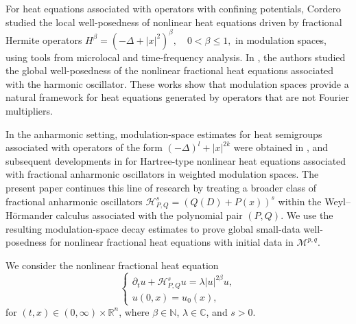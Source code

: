 \documentclass[12pt, reqno]{amsart}
\newcommand{\M}{\mathcal{M}}
\theoremstyle{definition}
\theoremstyle{remark}
\numberwithin{equation}{section}
\newcommand{\APQ}{\mathcal{H}_{P, Q}}
\begin{document}
For heat equations associated with operators with confining potentials, Cordero \cite{CorderoHermite} studied the local well-posedness of nonlinear heat equations driven by fractional Hermite operators $H^\beta=(-\Delta+|x|^2)^\beta,
\quad 0<\beta\leq 1,$ in modulation spaces, using tools from microlocal and time-frequency analysis. In \cite{than:hs}, the authors studied the global well-posedness of the nonlinear fractional heat equations associated with the harmonic oscillator.  These works show that modulation spaces provide a natural framework for heat equations generated by operators that are not Fourier multipliers.

In the anharmonic setting, modulation-space estimates for heat semigroups associated with operators of the form $(-\Delta)^l+|x|^{2k}$
were obtained in \cite{Cardona}, and subsequent developments in \cite{Dolai, Dolai2} for  Hartree-type nonlinear heat equations associated with fractional anharmonic oscillators in weighted modulation spaces. The present paper continues this line of research by treating a broader class of fractional anharmonic oscillators $\mathcal H_{P,Q}^s=(Q(D)+P(x))^s$
within the Weyl--H\"ormander calculus associated with the polynomial pair $(P,Q)$. We use the resulting modulation-space decay estimates to prove global small-data well-posedness for nonlinear fractional heat equations with initial data in $\M^{p,q}$.



We consider the nonlinear fractional heat equation
\begin{equation}
\label{nonpro}
    \begin{cases}
        \partial_t u+\APQ^s u=\lambda |u|^{2\beta}u,\\
        u(0,x)=u_0(x),
    \end{cases}
\end{equation}
for $(t,x)\in(0,\infty)\times\mathbb R^n$, where $\beta\in\mathbb N$, $\lambda\in\mathbb C$, and $s>0$.
\end{document}
